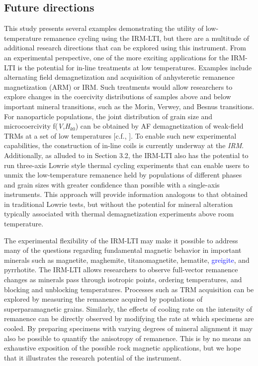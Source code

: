 \documentclass[draft,gc]{AGUTeX}
\begin{document}
\begin{article}
\section{Future directions}

This study presents several examples demonstrating the utility of low-temperature remanence cycling using the IRM-LTI, but there are a multitude of additional research directions that can be explored using this instrument. From an experimental perspective, one of the more exciting applications for the IRM-LTI is the potential for in-line treatments at low temperatures. Examples include alternating field demagnetization and acquisition of anhysteretic remanence magnetization (ARM) or IRM. Such treatments would allow researchers to explore changes in the coercivity distributions of samples above and below important mineral transitions, such as the Morin, Verwey, and Besnus transitions. For nanoparticle populations, the joint distribution of grain size and microcoercivity f(\textit{V},\textit{H}$_{k0}$) can be obtained by AF demagnetization of weak-field TRMs at a set of low temperatures [c.f., \cite{Dunlop1969a}].  To enable such new experimental capabilities, the construction of in-line coils is currently underway at the \textit{IRM}. Additionally, as alluded to in Section 3.2, the IRM-LTI also has the potential to run three-axis Lowrie style thermal cycling experiments that can enable users to unmix the low-temperature remanence held by populations of different phases and grain sizes with greater confidence than possible with a single-axis instruments. This approach will provide information analogous to that obtained in traditional Lowrie tests, but without the potential for mineral alteration typically associated with thermal demagnetization experiments above room temperature.

The experimental flexibility of the IRM-LTI may make it possible to address many of the questions regarding fundamental magnetic behavior in important minerals such as magnetite, maghemite, titanomagnetite, hematite, \textcolor{blue}{greigite}, and pyrrhotite. The IRM-LTI allows researchers to observe full-vector remanence changes as minerals pass through isotropic points, ordering temperatures, and blocking and unblocking temperatures. Processes such as TRM acquisition can be explored by measuring the remanence acquired by populations of superparamagnetic grains. Similarly, the effects of cooling rate on the intensity of remanence can be directly observed by modifying the rate at which specimens are cooled. By preparing specimens with varying degrees of mineral alignment it may also be possible to quantify the anisotropy of remanence. This is by no means an exhaustive exposition of the possible rock magnetic applications, but we hope that it illustrates the research potential of the instrument.     


\end{article}
\end{document}
